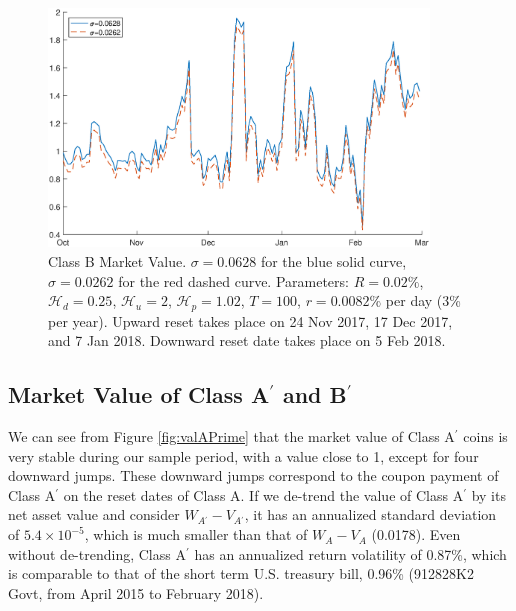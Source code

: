 \documentclass[final,pdftex]{ectaart}
\newcommand{\Ap}{A\ensuremath{^\prime}\xspace}
\newcommand{\Bp}{B\ensuremath{^\prime}\xspace}
\theoremstyle{plain}
\begin{document}
\begin{figure}[htb]
\begin{centering}
\includegraphics[width=0.9\textwidth]{WB}
\par\end{centering}
\caption{Class B Market Value. $\sigma = 0.0628$ for the blue solid curve, $\sigma=0.0262$ for the red dashed curve. Parameters: $R=0.02\%$, $\mathcal{H}_{d}=0.25$, $\mathcal{H}_{u} =2$, $\mathcal{H}_{p}=1.02$, $T=100$, $r=0.0082\%$ per day (3\% per year). Upward reset takes place on 24 Nov 2017, 17 Dec 2017, and 7 Jan 2018. Downward reset date takes place on 5 Feb 2018.}
\label{fig:valB}
\end{figure}


\subsection{\texorpdfstring{Market Value of Class \Ap and \Bp}{Lg}}

We can see from Figure \ref{fig:valAPrime} that the market value of Class A$^\prime$ coins is very stable during our sample period, with a value close to 1, except for four downward jumps. These downward jumps correspond to the coupon payment of Class \Ap on the reset dates of Class A. If we de-trend the value of Class \Ap by its net asset value and consider $W_{\Ap}-V_{\Ap}$, it has an annualized standard deviation of $5.4\times 10^{-5}$, which is much smaller than that of $W_{A}-V_{A}$ (0.0178). Even without de-trending, Class \Ap has an annualized return volatility of 0.87\%, which is comparable to that of the short term U.S. treasury bill, 0.96\% (912828K2 Govt, from April 2015 to February 2018).
\end{document}
